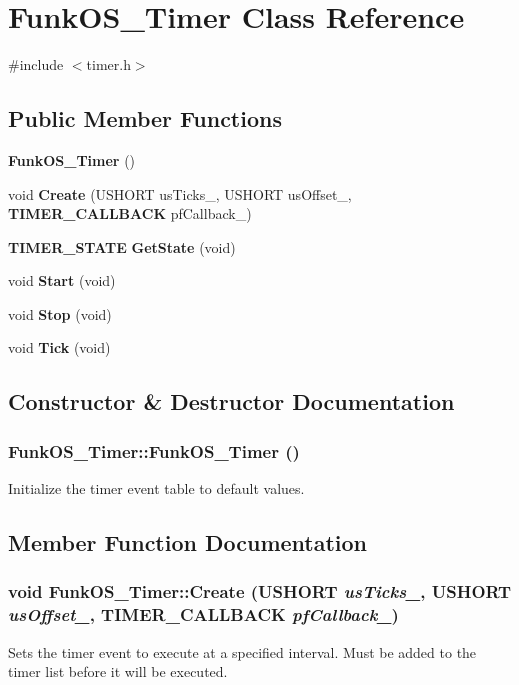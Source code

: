 \section{FunkOS\_\-Timer Class Reference}
\label{class_funk_o_s___timer}


{\ttfamily \#include $<$timer.h$>$}\subsection*{Public Member Functions}
\begin{DoxyCompactItemize}
\item 
{\bf FunkOS\_\-Timer} ()
\item 
void {\bf Create} (USHORT usTicks\_\-, USHORT usOffset\_\-, {\bf TIMER\_\-CALLBACK} pfCallback\_\-)
\item 
{\bf TIMER\_\-STATE} {\bf GetState} (void)
\item 
void {\bf Start} (void)
\item 
void {\bf Stop} (void)
\item 
void {\bf Tick} (void)
\end{DoxyCompactItemize}


\subsection{Constructor \& Destructor Documentation}
\subsubsection[{FunkOS\_\-Timer}]{\setlength{\rightskip}{0pt plus 5cm}FunkOS\_\-Timer::FunkOS\_\-Timer ()}\label{class_funk_o_s___timer_a5da1f35a91a28f6504203c433f2c7ab1}
Initialize the timer event table to default values. 

\subsection{Member Function Documentation}
\subsubsection[{Create}]{\setlength{\rightskip}{0pt plus 5cm}void FunkOS\_\-Timer::Create (USHORT {\em usTicks\_\-}, \/  USHORT {\em usOffset\_\-}, \/  {\bf TIMER\_\-CALLBACK} {\em pfCallback\_\-})}\label{class_funk_o_s___timer_a4c403ea7eaebf88101a6ada4837c1e02}
Sets the timer event to execute at a specified interval. Must be added to the timer list before it will be executed.


